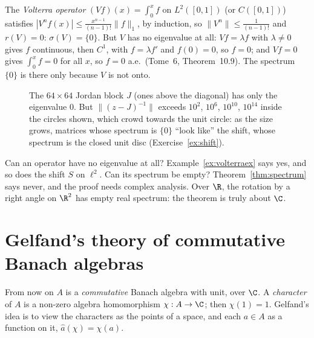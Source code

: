 \begin{example}\label{ex:volterraex}
The \emph{Volterra operator} $(Vf)(x)=\int_0^xf$ on $L^2([0,1])$ (or $C([0,1])$) satisfies $|V^nf(x)|\le\frac{x^{n-1}}{(n-1)!}\|f\|_1$, by induction, so $\|V^n\|\le\frac1{(n-1)!}$ and $r(V)=0$: $\sigma(V)=\{0\}$. But $V$ has no eigenvalue at
all: $Vf=\lambda f$ with $\lambda\ne0$ gives $f$ continuous, then $C^1$, with $f=\lambda f'$ and $f(0)=0$, so $f=0$; and $Vf=0$ gives $\int_0^xf=0$ for all $x$, so $f=0$ a.e.\ (Tome~6, Theorem~10.9). The spectrum $\{0\}$ is
there only because $V$ is not onto.
\end{example}

\begin{figure}[ht]
\centering
{}
\caption{The $64\times64$ Jordan block $J$ (ones above the diagonal) has only the eigenvalue $0$. But $\|(z-J)^{-1}\|$ exceeds $10^{2}$, $10^{6}$, $10^{10}$, $10^{14}$ inside the circles shown, which crowd towards the unit circle: as the
size grows, matrices whose spectrum is $\{0\}$ ``look like'' the shift, whose spectrum is the closed unit disc (Exercise~\ref{ex:shift}).}
\label{fig:pseudospectra}
\end{figure}

\begin{think}
Can an operator have no eigenvalue at all? Example~\ref{ex:volterraex} says yes, and so does the shift $S$ on $\ell^2$. Can its spectrum be empty? Theorem~\ref{thm:spectrum} says never, and the proof needs complex analysis. Over $\R$,
the rotation by a right angle on $\R^2$ has empty real spectrum: the theorem is truly about $\C$.
\end{think}

\section{Gelfand's theory of commutative Banach algebras}

From now on $A$ is a \emph{commutative} Banach algebra with unit, over $\C$. A \emph{character} of $A$ is a non-zero algebra homomorphism $\chi:A\to\C$; then $\chi(1)=1$. Gelfand's idea is to view the characters as the points of a space, and
each $a\in A$ as a function on it, $\hat a(\chi)=\chi(a)$.

